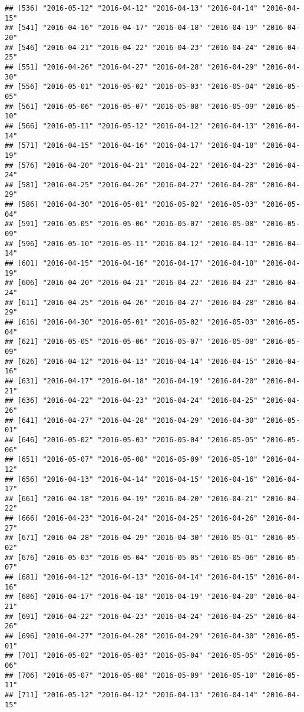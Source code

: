\documentclass[
]{article}
\begin{document}
\begin{verbatim}
## [536] "2016-05-12" "2016-04-12" "2016-04-13" "2016-04-14" "2016-04-15"
## [541] "2016-04-16" "2016-04-17" "2016-04-18" "2016-04-19" "2016-04-20"
## [546] "2016-04-21" "2016-04-22" "2016-04-23" "2016-04-24" "2016-04-25"
## [551] "2016-04-26" "2016-04-27" "2016-04-28" "2016-04-29" "2016-04-30"
## [556] "2016-05-01" "2016-05-02" "2016-05-03" "2016-05-04" "2016-05-05"
## [561] "2016-05-06" "2016-05-07" "2016-05-08" "2016-05-09" "2016-05-10"
## [566] "2016-05-11" "2016-05-12" "2016-04-12" "2016-04-13" "2016-04-14"
## [571] "2016-04-15" "2016-04-16" "2016-04-17" "2016-04-18" "2016-04-19"
## [576] "2016-04-20" "2016-04-21" "2016-04-22" "2016-04-23" "2016-04-24"
## [581] "2016-04-25" "2016-04-26" "2016-04-27" "2016-04-28" "2016-04-29"
## [586] "2016-04-30" "2016-05-01" "2016-05-02" "2016-05-03" "2016-05-04"
## [591] "2016-05-05" "2016-05-06" "2016-05-07" "2016-05-08" "2016-05-09"
## [596] "2016-05-10" "2016-05-11" "2016-04-12" "2016-04-13" "2016-04-14"
## [601] "2016-04-15" "2016-04-16" "2016-04-17" "2016-04-18" "2016-04-19"
## [606] "2016-04-20" "2016-04-21" "2016-04-22" "2016-04-23" "2016-04-24"
## [611] "2016-04-25" "2016-04-26" "2016-04-27" "2016-04-28" "2016-04-29"
## [616] "2016-04-30" "2016-05-01" "2016-05-02" "2016-05-03" "2016-05-04"
## [621] "2016-05-05" "2016-05-06" "2016-05-07" "2016-05-08" "2016-05-09"
## [626] "2016-04-12" "2016-04-13" "2016-04-14" "2016-04-15" "2016-04-16"
## [631] "2016-04-17" "2016-04-18" "2016-04-19" "2016-04-20" "2016-04-21"
## [636] "2016-04-22" "2016-04-23" "2016-04-24" "2016-04-25" "2016-04-26"
## [641] "2016-04-27" "2016-04-28" "2016-04-29" "2016-04-30" "2016-05-01"
## [646] "2016-05-02" "2016-05-03" "2016-05-04" "2016-05-05" "2016-05-06"
## [651] "2016-05-07" "2016-05-08" "2016-05-09" "2016-05-10" "2016-04-12"
## [656] "2016-04-13" "2016-04-14" "2016-04-15" "2016-04-16" "2016-04-17"
## [661] "2016-04-18" "2016-04-19" "2016-04-20" "2016-04-21" "2016-04-22"
## [666] "2016-04-23" "2016-04-24" "2016-04-25" "2016-04-26" "2016-04-27"
## [671] "2016-04-28" "2016-04-29" "2016-04-30" "2016-05-01" "2016-05-02"
## [676] "2016-05-03" "2016-05-04" "2016-05-05" "2016-05-06" "2016-05-07"
## [681] "2016-04-12" "2016-04-13" "2016-04-14" "2016-04-15" "2016-04-16"
## [686] "2016-04-17" "2016-04-18" "2016-04-19" "2016-04-20" "2016-04-21"
## [691] "2016-04-22" "2016-04-23" "2016-04-24" "2016-04-25" "2016-04-26"
## [696] "2016-04-27" "2016-04-28" "2016-04-29" "2016-04-30" "2016-05-01"
## [701] "2016-05-02" "2016-05-03" "2016-05-04" "2016-05-05" "2016-05-06"
## [706] "2016-05-07" "2016-05-08" "2016-05-09" "2016-05-10" "2016-05-11"
## [711] "2016-05-12" "2016-04-12" "2016-04-13" "2016-04-14" "2016-04-15"

\end{verbatim}
\end{document}
